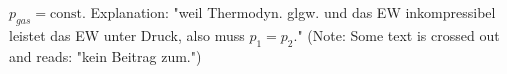 \( p_{gas} = \text{const.} \)  
Explanation:  
"weil Thermodyn. glgw. und das EW inkompressibel leistet das EW unter Druck, also muss \( p_1 = p_2 \)."  
(Note: Some text is crossed out and reads: "kein Beitrag zum.")